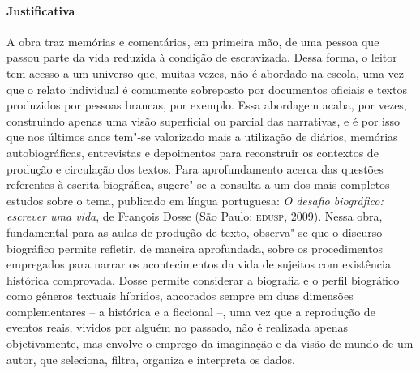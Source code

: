 \documentclass[11pt]{extarticle}
\begin{document}
 \paragraph{Justificativa} A obra traz memórias e comentários, em primeira mão, de uma
pessoa que passou parte da vida reduzida à condição de escravizada.
Dessa forma, o leitor tem acesso a um universo que, muitas vezes, não é
abordado na escola, uma vez que o relato individual é comumente
sobreposto por documentos oficiais e textos produzidos por pessoas
brancas, por exemplo. Essa abordagem acaba, por vezes, construindo
apenas uma visão superficial ou parcial das narrativas, e é por isso que
nos últimos anos tem"-se valorizado mais a utilização de diários,
memórias autobiográficas, entrevistas e depoimentos para reconstruir os
contextos de produção e circulação dos textos. 
Para aprofundamento acerca das questões
  referentes à escrita biográfica, sugere"-se a consulta a um dos mais
  completos estudos sobre o tema, publicado em língua portuguesa:
  \emph{O desafio biográfico: escrever uma vida}, de François Dosse (São
  Paulo: \textsc{edusp}, 2009). Nessa obra, fundamental para as aulas de produção
  de texto, observa"-se que o discurso biográfico permite refletir, de
  maneira aprofundada, sobre os procedimentos empregados para narrar os
  acontecimentos da vida de sujeitos com existência histórica
  comprovada. Dosse permite considerar a biografia e o perfil biográfico
  como gêneros textuais híbridos, ancorados sempre em duas dimensões
  complementares -- a histórica e a ficcional --, uma vez que a
  reprodução de eventos reais, vividos por alguém no passado, não é
  realizada apenas objetivamente, mas envolve o emprego da imaginação e
  da visão de mundo de um autor, que seleciona, filtra, organiza e
  interpreta os dados.
\end{document}
